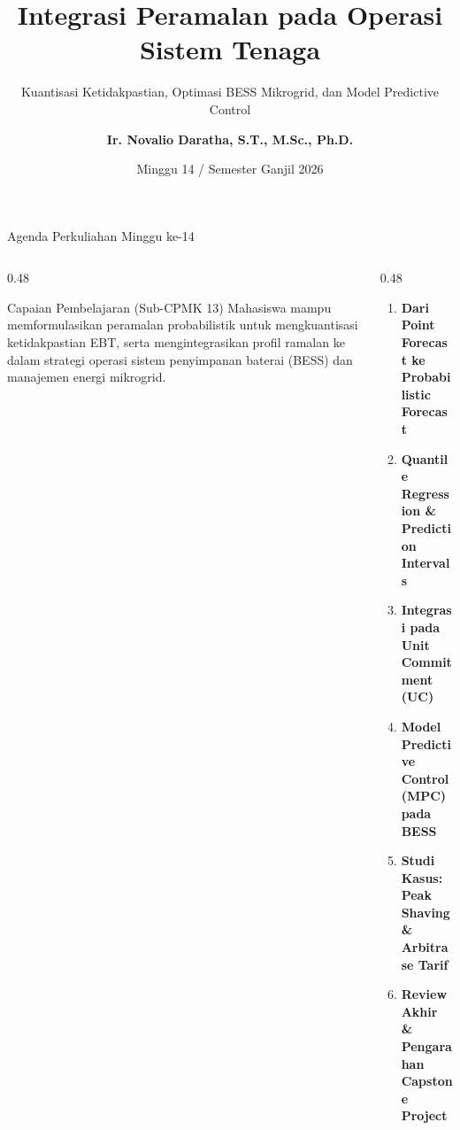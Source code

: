 \documentclass[aspectratio=169, 10pt]{beamer}
\title[\textbf{Deret Waktu (Minggu 14)}]{\textbf{Integrasi Peramalan pada Operasi Sistem Tenaga}}
\subtitle{Kuantisasi Ketidakpastian, Optimasi BESS Mikrogrid, dan Model Predictive Control}
\author[\textbf{Ir. Novalio Daratha, Ph.D.}]{\textbf{Ir. Novalio Daratha, S.T., M.Sc., Ph.D.}}
\institute[FT UNIB]{Program Studi Teknik Elektro -- Fakultas Teknik\\Universitas Bengkulu}
\date{Minggu 14 / Semester Ganjil 2026}
\begin{document}
\begin{frame}[plain]
    \titlepage
\end{frame}

\begin{frame}{Agenda Perkuliahan Minggu ke-14}
    \begin{columns}[T]
        \begin{column}{0.48\textwidth}
            \begin{block}{Capaian Pembelajaran (Sub-CPMK 13)}
                Mahasiswa mampu memformulasikan peramalan probabilistik untuk mengkuantisasi ketidakpastian EBT, serta mengintegrasikan profil ramalan ke dalam strategi operasi sistem penyimpanan baterai (BESS) dan manajemen energi mikrogrid.
            \end{block}
        \end{column}
        \begin{column}{0.48\textwidth}
            \begin{enumerate}
                \item \textbf{Dari Point Forecast ke Probabilistic Forecast}
                \item \textbf{Quantile Regression \& Prediction Intervals}
                \item \textbf{Integrasi pada Unit Commitment (UC)}
                \item \textbf{Model Predictive Control (MPC) pada BESS}
                \item \textbf{Studi Kasus: Peak Shaving \& Arbitrase Tarif}
                \item \textbf{Review Akhir \& Pengarahan Capstone Project}
            \end{enumerate}
        \end{column}
    \end{columns}
\end{frame}
\end{document}
